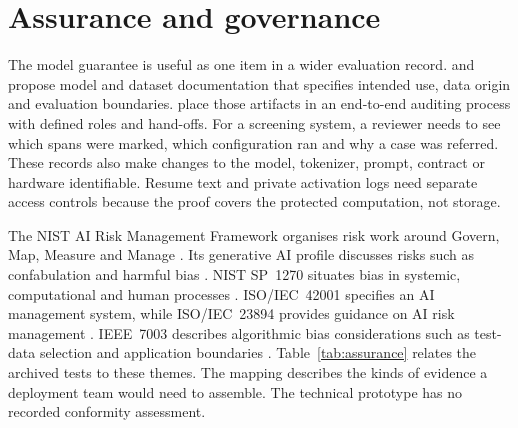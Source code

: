 \section{Assurance and governance}
\label{sec:assurance}

The model guarantee is useful as one item in a wider evaluation record. \citet{mitchell2019} and \citet{gebru2021} propose model and dataset documentation that specifies intended use, data origin and evaluation boundaries. \citet{raji2020} place those artifacts in an end-to-end auditing process with defined roles and hand-offs. For a screening system, a reviewer needs to see which spans were marked, which configuration ran and why a case was referred. These records also make changes to the model, tokenizer, prompt, contract or hardware identifiable. Resume text and private activation logs need separate access controls because the proof covers the protected computation, not storage.

The NIST AI Risk Management Framework organises risk work around Govern, Map, Measure and Manage \citep{nist100}. Its generative AI profile discusses risks such as confabulation and harmful bias \citep{nist600}. NIST SP~1270 situates bias in systemic, computational and human processes \citep{nist1270}. ISO/IEC~42001 specifies an AI management system, while ISO/IEC~23894 provides guidance on AI risk management \citep{iso42001,iso23894}. IEEE~7003 describes algorithmic bias considerations such as test-data selection and application boundaries \citep{ieee7003}. Table~\ref{tab:assurance} relates the archived tests to these themes. The mapping describes the kinds of evidence a deployment team would need to assemble. The technical prototype has no recorded conformity assessment.

